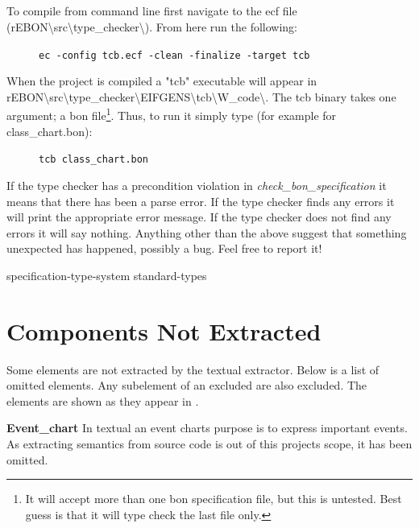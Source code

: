 \paragraph{}\noindent
To compile from command line first navigate to the ecf file (rEBON\textbackslash src\textbackslash type\_checker\textbackslash). From here run the following:
\begin{figure}[H]
\begin{center}{\texttt{ec -config tcb.ecf -clean -finalize -target tcb}}\end{center}
\end{figure}
When the project is compiled a "tcb" executable will appear in \newline rEBON\textbackslash src\textbackslash type\_checker\textbackslash EIFGENS\textbackslash tcb\textbackslash W\_code\textbackslash. The tcb binary takes one argument; a bon file\footnote{It will accept more than one bon specification file, but this is untested. Best guess is that it will type check the last file only.}. Thus, to run it simply type (for example for class\_chart.bon): 
\begin{figure}[H]
\begin{center}{\texttt{tcb class\_chart.bon}}\end{center}
\end{figure}
If the type checker has a precondition violation in \textit{check\_bon\_specification} it means that there has been a parse error. If the type checker finds any errors it will print the appropriate error message. If the type checker does not find any errors it will say nothing. Anything other than the above suggest that something unexpected has happened, possibly a bug. Feel free to report it!

{specification-type-system}
{standard-types}
\chapter{Components Not Extracted}
\label{components-not-extracted}
Some elements are not extracted by the textual \bon{} extractor. Below is a list of omitted elements. Any subelement of an excluded are also excluded. The elements are shown as they appear in \cite[pp. 352--359]{walden1995}.\newline\newline

\noindent\textbf{Event\_chart}\newline
In textual \bon{} an event charts purpose is to express important events. As extracting semantics from source code is out of this projects scope, it has been omitted.\newline\newline

